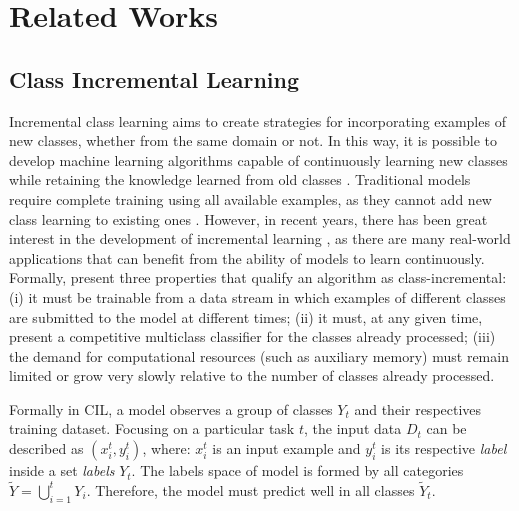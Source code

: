 \documentclass[letterpaper]{article} %
\begin{document}


\section{Related Works}
\subsection{Class Incremental Learning}

Incremental class learning aims to create strategies for incorporating examples of new classes, whether from the same domain or not. In this way, it is possible to develop machine learning algorithms capable of continuously learning new classes while retaining the knowledge learned from old classes \cite{Thrun_10.5555/2998828.2998919, Rebuffi:2007}. Traditional models require complete training using all available examples, as they cannot add new class learning to existing ones \cite{castro2018endtoend}. However, in recent years, there has been great interest in the development of incremental learning \cite{Chen8457525}, as there are many real-world applications that can benefit from the ability of models to learn continuously. Formally, \cite{Rosenfeld_8554156} present three properties that qualify an algorithm as class-incremental:
(i) it must be trainable from a data stream in which examples of different classes are submitted to the model at different times;
(ii) it must, at any given time, present a competitive multiclass classifier for the classes already processed;
(iii) the demand for computational resources (such as auxiliary memory) must
remain limited or grow very slowly relative to the number
of classes already processed.

Formally in CIL, a model observes a group of classes ${{Y}_{t}}$ and their respectives training dataset. Focusing on a particular task  ${t}$, the input data ${{D}_{t}}$ can be described as ${({x}_{i}^{t}, {y}_{i}^{t})}$, where:  ${{x}_{i}^{t}}$ is an input example and ${{y}_{i}^{t}}$ is its respective  \textit{label} inside a set  \textit{labels} ${{Y}_{t}}$. The labels space of model is formed by all categories ${\tilde{Y} = \bigcup_{i=1}^{t} {Y}_{i}}$. Therefore, the model must predict well in all classes ${{\tilde{Y}}_{t}}$.\
\end{document}

